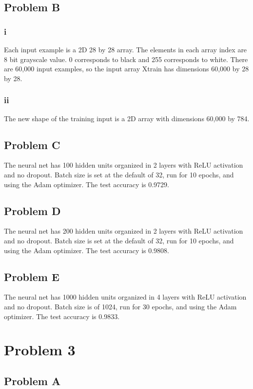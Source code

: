 \documentclass[12pt]{article} %
\begin{document}
\subsection{Problem B}
\subsubsection{i}
Each input example is a 2D 28 by 28 array. The elements in each array index are 8 bit grayscale value. 0 corresponds to black and 255 corresponds to white. There are 60,000 input examples, so the input array Xtrain has dimensions 60,000 by 28 by 28.

\subsubsection{ii}
The new shape of the training input is a 2D array with dimensions 60,000 by 784.

\subsection{Problem C}
The neural net has 100 hidden units organized in 2 layers with ReLU activation and no dropout. Batch size is set at the default of 32, run for 10 epochs, and using the Adam optimizer. The test accuracy is 0.9729.

\subsection{Problem D}
The neural net has 200 hidden units organized in 2 layers with ReLU activation and no dropout. Batch size is set at the default of 32, run for 10 epochs, and using the Adam optimizer. The test accuracy is 0.9808.

\subsection{Problem E}
The neural net has 1000 hidden units organized in 4 layers with ReLU activation and no dropout. Batch size is of 1024, run for 30 epochs, and using the Adam optimizer. The test accuracy is 0.9833.


\section{Problem 3}

\subsection{Problem A}
\end{document}
